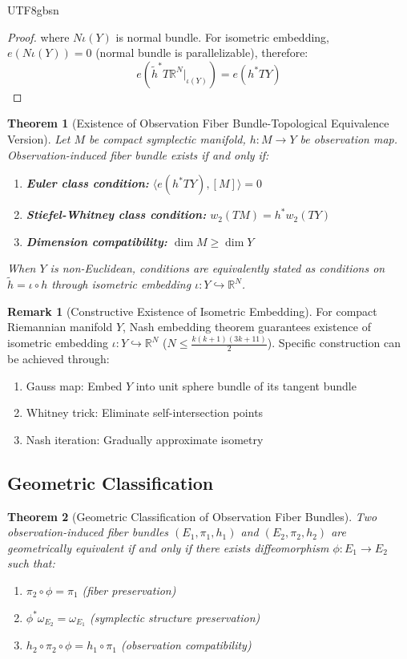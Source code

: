 \documentclass[a4paper,12pt]{extarticle}
\newtheorem{theorem}{Theorem}
\theoremstyle{definition}
\newtheorem{remark}{Remark}
\begin{document}
\begin{CJK}{UTF8}{gbsn}
\begin{proof}
where $N\iota(Y)$ is normal bundle. For isometric embedding, $e(N\iota(Y)) = 0$ (normal bundle is parallelizable), therefore:
$$e(\tilde{h}^*T\mathbb{R}^N|_{\iota(Y)}) = e(h^*TY)$$
\end{proof}

\begin{theorem}[Existence of Observation Fiber Bundle-Topological Equivalence Version]
Let $M$ be compact symplectic manifold, $h: M \to Y$ be observation map. Observation-induced fiber bundle exists if and only if:
\begin{enumerate}[label=(\arabic*)]
\item \textbf{Euler class condition:} $\langle e(h^*TY), [M] \rangle = 0$
\item \textbf{Stiefel-Whitney class condition:} $w_2(TM) = h^*w_2(TY)$  
\item \textbf{Dimension compatibility:} $\dim M \geq \dim Y$
\end{enumerate}

When $Y$ is non-Euclidean, conditions are equivalently stated as conditions on $\tilde{h} = \iota \circ h$ through isometric embedding $\iota: Y \hookrightarrow \mathbb{R}^N$.
\end{theorem}

\begin{remark}[Constructive Existence of Isometric Embedding]
For compact Riemannian manifold $Y$, Nash embedding theorem guarantees existence of isometric embedding $\iota: Y \hookrightarrow \mathbb{R}^N$ ($N \leq \frac{k(k+1)(3k+11)}{2}$). Specific construction can be achieved through:
\begin{enumerate}
\item Gauss map: Embed $Y$ into unit sphere bundle of its tangent bundle
\item Whitney trick: Eliminate self-intersection points
\item Nash iteration: Gradually approximate isometry
\end{enumerate}
\end{remark}



\subsection{Geometric Classification}

\begin{theorem}[Geometric Classification of Observation Fiber Bundles]
Two observation-induced fiber bundles $(E_1, \pi_1, h_1)$ and $(E_2, \pi_2, h_2)$ are geometrically equivalent if and only if there exists diffeomorphism $\phi: E_1 \to E_2$ such that:
\begin{enumerate}[label=(\arabic*)]
\item $\pi_2 \circ \phi = \pi_1$ (fiber preservation)
\item $\phi^*\omega_{E_2} = \omega_{E_1}$ (symplectic structure preservation)
\item $h_2 \circ \pi_2 \circ \phi = h_1 \circ \pi_1$ (observation compatibility)
\end{enumerate}
\end{theorem}



\end{CJK}
\end{document}
